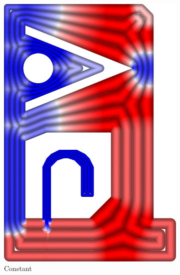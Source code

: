 \begin{figure}
\begin{subfigure}{\figwidth}
\includegraphics[height=\figheight]{sources/validation/gMAT_example/TEST_Constant_widths.png}
\caption{Constant}\label{TEST_Constant_accuracy}
\end{subfigure}
\begin{subfigure}{\figwidth}\centering

\end{subfigure}
\end{figure}
